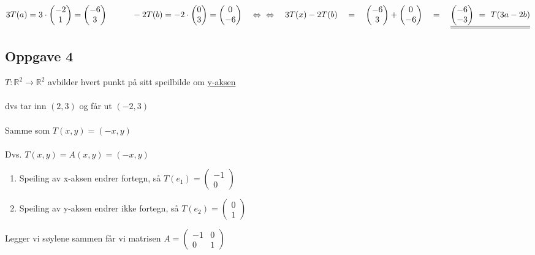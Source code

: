 \documentclass{article}
\begin{document}
\(3T(a) = 3\cdot\begin{pmatrix}
    -2 \\ 1
\end{pmatrix} = \begin{pmatrix}
    -6 \\ 3
\end{pmatrix}
\quad \quad \quad
-2T(b) = -2\cdot\begin{pmatrix}
    0 \\ 3
\end{pmatrix} = \begin{pmatrix}
    0 \\ -6
\end{pmatrix}
\quad \Leftrightarrow\\ \\ \\ \Leftrightarrow \quad
3T(x)-2T(b) \quad=\quad \begin{pmatrix}
    -6 \\ 3
\end{pmatrix} + \begin{pmatrix}
    0 \\ -6
\end{pmatrix} \quad=\quad \underline{\underline{\begin{pmatrix}
    -6 \\ -3
\end{pmatrix} \ = \ T(3a-2b)}}\)

\subsection*{Oppgave 4}

\(T : \mathbb{R}^2 \rightarrow \mathbb{R}^2\) avbilder hvert punkt på sitt speilbilde om \underline{y-aksen} \\\\
dvs tar inn $(2, 3)$ og får ut $(-2, 3)$ \\\\
Samme som $T(x,y) = (-x, y)$ \\\\
Dvs. $T(x, y) = A(x, y) = (-x, y)$
\begin{enumerate}[]
    \item Speiling av x-aksen endrer fortegn, så $T(e_1) = \begin{pmatrix}
        -1 \\ 0
    \end{pmatrix}$
    \item Speiling av y-aksen endrer ikke fortegn, så $T(e_2) = \begin{pmatrix}
        0 \\ 1
    \end{pmatrix}$
\end{enumerate}
Legger vi søylene sammen får vi matrisen \underline{\underline{$A = \begin{pmatrix}
    -1 & 0 \\ 0 & 1
\end{pmatrix}$}}
\end{document}
